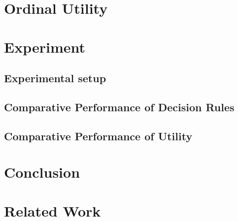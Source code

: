 \documentclass[sigconf]{acmart}
\begin{document}
\section{Ordinal Utility}






\section{Experiment}

\subsection{Experimental setup}

\subsection{Comparative Performance of Decision Rules} 

\subsection{Comparative Performance of Utility}


\section{Conclusion}

\section{Related Work}
\end{document}
